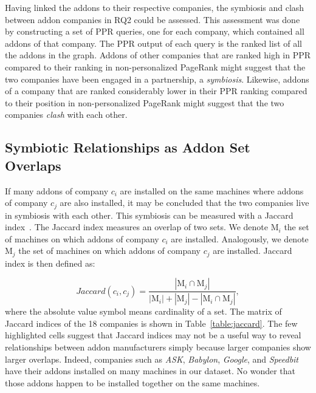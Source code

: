 \documentclass[10pt,letterpaper]{article}
\begin{document}
Having linked the addons to their respective companies, the symbiosis and clash between addon companies in RQ2 could be assessed. This assessment was done by constructing a set of PPR queries, one for each company, which contained all addons of that company. The PPR output of each query is the ranked list of all the addons in the graph. Addons of other companies that are ranked high in PPR compared to their ranking in non-personalized PageRank might suggest that the two companies have been engaged in a partnership, a \textit{symbiosis}. Likewise, addons of a company that are ranked considerably lower in their PPR ranking compared to their position in non-personalized PageRank might suggest that the two companies \textit{clash} with each other. 

\subsection*{Symbiotic Relationships as Addon Set Overlaps}

If many addons of company $c_i$ are installed on the same machines where addons of company $c_j$ are also installed, it may be concluded that the two companies live in symbiosis with each other. This symbiosis can be measured with a Jaccard index~\cite{jaccard1912distribution}. The Jaccard index measures an overlap of two sets. We denote ${\boldsymbol{\mathrm{M}}}_i$ the set of machines on which addons of company $c_i$ are installed. Analogously, we denote ${\boldsymbol{\mathrm{M}}}_j$ the set of machines on which addons of company $c_j$ are installed. Jaccard index is then defined as: 


\begin{equation} \label{GrindEQ__5_} 
Jaccard(c_i,c_j) = \frac{|\boldsymbol{\mathrm{M}}_i \cap \boldsymbol{\mathrm{M}}_j|} {|\boldsymbol{\mathrm{M}}_i| + |\boldsymbol{\mathrm{M}}_j| - |\boldsymbol{\mathrm{M}}_i \cap \boldsymbol{\mathrm{M}}_j|},
\end{equation} 
\noindent where the absolute value symbol means cardinality of a set. The matrix of Jaccard indices of the 18 companies is shown in Table~\ref{table:jaccard}. The few highlighted cells suggest that Jaccard indices may not be a useful way to reveal relationships between addon manufacturers simply because larger companies show larger overlaps. Indeed, companies such as \textit{ASK}, \textit{Babylon}, \textit{Google}, and \textit{Speedbit} have their addons installed on many machines in our dataset. No wonder that those addons happen to be installed together on the same machines.
\end{document}
